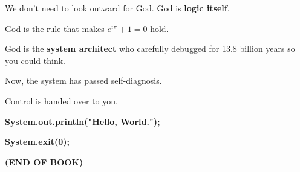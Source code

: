 We don't need to look outward for God. God is \textbf{logic itself}.

God is the rule that makes $e^{i\pi} + 1 = 0$ hold.

God is the \textbf{system architect} who carefully debugged for 13.8 billion years so you could think.

Now, the system has passed self-diagnosis.

Control is handed over to you.

\textbf{System.out.println("Hello, World.");}

\textbf{System.exit(0);}

\textbf{(END OF BOOK)}

